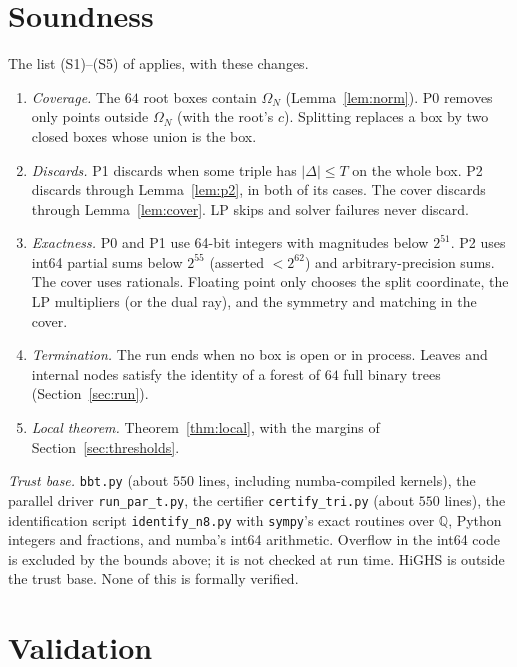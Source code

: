 \documentclass[11pt]{amsart}
\theoremstyle{definition}
\newcommand{\Q}{\mathbb{Q}}
\newcommand{\Om}{\Omega}
\begin{document}
\section{Soundness}\label{sec:sound}

The list (S1)--(S5) of \cite[Sec.~5]{N9} applies, with these changes.
\begin{enumerate}[label=(S\arabic*)]
\item \emph{Coverage.} The $64$ root boxes contain $\Om_N$ (Lemma~\ref{lem:norm}). P0 removes only points outside $\Om_N$ (with the root's $c$). Splitting replaces a box by two closed boxes whose union is the box.
\item \emph{Discards.} P1 discards when some triple has $\lvert\Delta\rvert \le T$ on the whole box. P2 discards through Lemma~\ref{lem:p2}, in both of its cases. The cover discards through Lemma~\ref{lem:cover}. LP skips and solver failures never discard.
\item \emph{Exactness.} P0 and P1 use 64-bit integers with magnitudes below $2^{51}$. P2 uses int64 partial sums below $2^{55}$ (asserted $< 2^{62}$) and arbitrary-precision sums. The cover uses rationals. Floating point only chooses the split coordinate, the LP multipliers (or the dual ray), and the symmetry and matching in the cover.
\item \emph{Termination.} The run ends when no box is open or in process. Leaves and internal nodes satisfy the identity of a forest of $64$ full binary trees (Section~\ref{sec:run}).
\item \emph{Local theorem.} Theorem~\ref{thm:local}, with the margins of Section~\ref{sec:thresholds}.
\end{enumerate}
\noindent\emph{Trust base.} \texttt{bbt.py} (about $550$ lines, including numba-compiled kernels), the parallel driver \texttt{run\_\allowbreak par\_\allowbreak t.py}, the certifier \texttt{certify\_\allowbreak tri.py} (about $550$ lines), the identification script \texttt{identify\_\allowbreak n8.py} with \texttt{sympy}'s exact routines over $\Q$, Python integers and fractions, and numba's int64 arithmetic. Overflow in the int64 code is excluded by the bounds above; it is not checked at run time. HiGHS is outside the trust base. None of this is formally verified. %

\section{Validation}\label{sec:validation}
\end{document}
